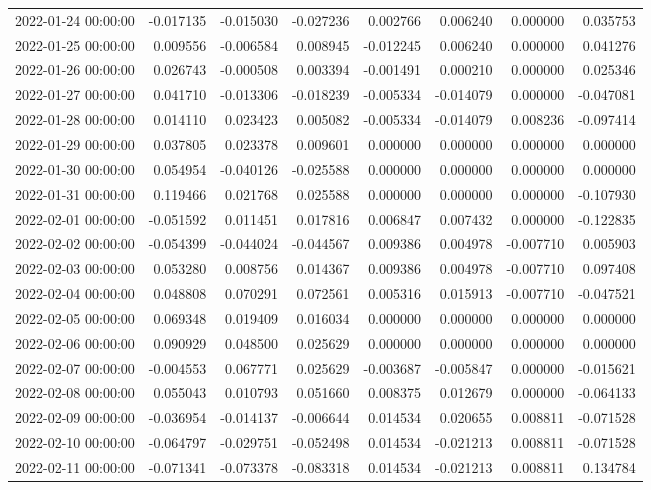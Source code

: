 \begin{tabular}{lrrrrrrr}
2022-01-24 00:00:00 & -0.017135 & -0.015030 & -0.027236 & 0.002766 & 0.006240 & 0.000000 & 0.035753 \\
2022-01-25 00:00:00 & 0.009556 & -0.006584 & 0.008945 & -0.012245 & 0.006240 & 0.000000 & 0.041276 \\
2022-01-26 00:00:00 & 0.026743 & -0.000508 & 0.003394 & -0.001491 & 0.000210 & 0.000000 & 0.025346 \\
2022-01-27 00:00:00 & 0.041710 & -0.013306 & -0.018239 & -0.005334 & -0.014079 & 0.000000 & -0.047081 \\
2022-01-28 00:00:00 & 0.014110 & 0.023423 & 0.005082 & -0.005334 & -0.014079 & 0.008236 & -0.097414 \\
2022-01-29 00:00:00 & 0.037805 & 0.023378 & 0.009601 & 0.000000 & 0.000000 & 0.000000 & 0.000000 \\
2022-01-30 00:00:00 & 0.054954 & -0.040126 & -0.025588 & 0.000000 & 0.000000 & 0.000000 & 0.000000 \\
2022-01-31 00:00:00 & 0.119466 & 0.021768 & 0.025588 & 0.000000 & 0.000000 & 0.000000 & -0.107930 \\
2022-02-01 00:00:00 & -0.051592 & 0.011451 & 0.017816 & 0.006847 & 0.007432 & 0.000000 & -0.122835 \\
2022-02-02 00:00:00 & -0.054399 & -0.044024 & -0.044567 & 0.009386 & 0.004978 & -0.007710 & 0.005903 \\
2022-02-03 00:00:00 & 0.053280 & 0.008756 & 0.014367 & 0.009386 & 0.004978 & -0.007710 & 0.097408 \\
2022-02-04 00:00:00 & 0.048808 & 0.070291 & 0.072561 & 0.005316 & 0.015913 & -0.007710 & -0.047521 \\
2022-02-05 00:00:00 & 0.069348 & 0.019409 & 0.016034 & 0.000000 & 0.000000 & 0.000000 & 0.000000 \\
2022-02-06 00:00:00 & 0.090929 & 0.048500 & 0.025629 & 0.000000 & 0.000000 & 0.000000 & 0.000000 \\
2022-02-07 00:00:00 & -0.004553 & 0.067771 & 0.025629 & -0.003687 & -0.005847 & 0.000000 & -0.015621 \\
2022-02-08 00:00:00 & 0.055043 & 0.010793 & 0.051660 & 0.008375 & 0.012679 & 0.000000 & -0.064133 \\
2022-02-09 00:00:00 & -0.036954 & -0.014137 & -0.006644 & 0.014534 & 0.020655 & 0.008811 & -0.071528 \\
2022-02-10 00:00:00 & -0.064797 & -0.029751 & -0.052498 & 0.014534 & -0.021213 & 0.008811 & -0.071528 \\
2022-02-11 00:00:00 & -0.071341 & -0.073378 & -0.083318 & 0.014534 & -0.021213 & 0.008811 & 0.134784 \\

\end{tabular}
